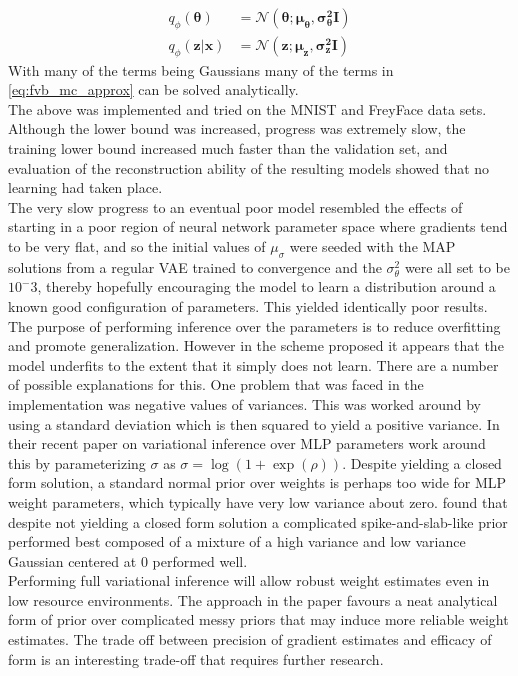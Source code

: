 \documentclass[../report.tex]{subfiles}
\begin{document}
\begin{equation}
\begin{split}
q_\phi(\mathbf{\theta}) & = \mathcal{N}(\mathbf{\theta}; \mathbf{\mu}_\mathbf{\theta}, \mathbf{\sigma^2_\theta}\mathbf{I})\\
q_\phi(\mathbf{z|x}) & = \mathcal{N}(\mathbf{z}; \mathbf{\mu}_\mathbf{z}, \mathbf{\sigma^2_z}\mathbf{I})
\end{split}
\end{equation}
With many of the terms being Gaussians many of the terms in \cref{eq:fvb_mc_approx} can be solved analytically.\\
The above was implemented and tried on the MNIST and FreyFace data sets. Although the lower bound was increased, progress was extremely slow, the training lower bound increased much faster than the validation set, and evaluation of the reconstruction ability of the resulting models showed that no learning had taken place.\\
The very slow progress to an eventual poor model resembled the effects of starting in a poor region of neural network parameter space where gradients tend to be very flat, and so the initial values of $\mu_\sigma$ were seeded with the MAP solutions from a regular VAE trained to convergence and the $\sigma_\theta^2$ were all set to be $10^-3$, thereby hopefully encouraging the model to learn a distribution around a known good configuration of parameters. This yielded identically poor results.\\
The purpose of performing inference over the parameters is to reduce overfitting and promote generalization. However in the scheme proposed it appears that the model underfits to the extent that it simply does not learn. There are a number of possible explanations for this. One problem that was faced in the implementation was negative values of variances. This was worked around by using a standard deviation which is then squared to yield a positive variance. In their recent paper on variational inference over MLP parameters \cite{blundell2015weight} work around this by parameterizing $\sigma$ as $\sigma = \log(1 + \exp(\rho))$. Despite yielding a closed form solution, a standard normal prior over weights is perhaps too wide for MLP weight parameters, which typically have very low variance about zero. \cite{blundell2015weight} found that despite not yielding a closed form solution a complicated spike-and-slab-like prior performed best composed of a mixture of a high variance and low variance Gaussian centered at 0 performed well.\\
Performing full variational inference will allow robust weight estimates even in low resource environments. The approach in the paper favours a neat analytical form of prior over complicated messy priors that may induce more reliable weight estimates. The trade off between precision of gradient estimates and efficacy of form is an interesting trade-off that requires further research.
\end{document}
